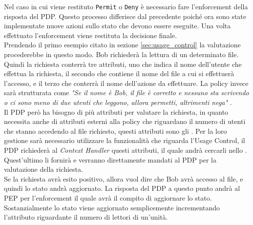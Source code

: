 Nel caso in cui viene restituto \texttt{Permit} o \texttt{Deny} è necessario fare l'enforcement della risposta del PDP. Questo processo differisce dal precedente poiché ora sono state implementate nuove azioni sullo stato che devono essere eseguite. Una volta effettuato l'enforcement viene restituta la decisione finale.\\
Prendendo il primo esempio citato in sezione \ref{sec:usage_control} la valutazione procederebbe in questo modo. Bob richiederà la lettura di un determinato file. Quindi la richiesta conterrà tre attributi, uno che indica il nome dell'utente che effettua la richiesta, il secondo che contiene il nome del file a cui si effettuerà l'accesso, e il terzo che conterrà il nome dell'azione da effettuare. La policy invece sarà strutturata come \textit{"Se il nome è Bob, il file è corretto e nessuno sta scrivendo o ci sono meno di due utenti che leggono, allora permetti, altrimenti nega" }.\\
Il PDP però ha bisogno di più attributi per valutare la richiesta, in quanto necessita anche di attributi esterni alla policy che riguardano il numero di utenti che stanno accedendo al file richiesto, questi attributi sono gli \statusattribute. Per la loro gestione sarà necessario utilizzare la funzionalità che riguarda l'Usage Control, il PDP richiederà al \textit{Context Handler} questi attributi, il quale andrà cercarli nello \status. Quest'ultimo li fornirà e verranno direttamente mandati al PDP per la valutazione della richiesta.\\
Se la richiesta avrà esito positivo, allora vuol dire che Bob avrà accesso al file, e quindi lo stato andrà aggiornato. La risposta del PDP a questo punto andrà al PEP per l'enforcement il quale avrà il compito di aggiornare lo stato. Sostanzialmente lo stato viene aggiornato semplicemente incrementando l'attributo riguardante il numero di lettori di un'unità.




